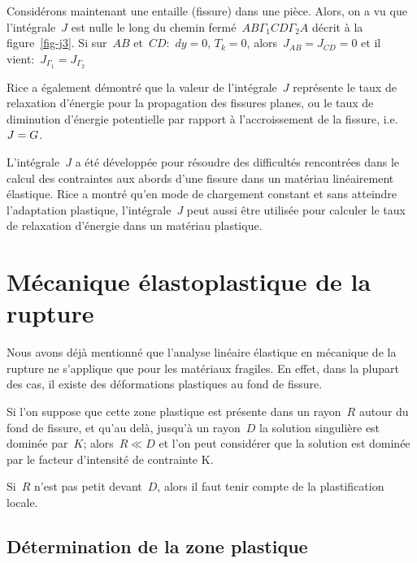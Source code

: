 \medskipvm
Considérons maintenant une entaille (fissure) dans une pièce. Alors, on a vu que l'intégrale~$J$ est nulle le long du chemin fermé~$AB\Gamma_1CD\Gamma_2A$ décrit à la figure~\ref{fig-j3}.
Si sur~$AB$ et~$CD$:~$dy=0$, $T_k=0$, alors~$J_{AB}=J_{CD}=0$
et il vient:~$J_{\Gamma_1} = J_{\Gamma_2}$

\medskip
Rice a également démontré que la valeur de l'intégrale~$J$ représente le taux de relaxation d'énergie pour la propagation des fissures planes, ou le taux de diminution d'énergie potentielle par rapport à l'accroissement de la fissure, i.e.~$\colorblue J=G$.

\medskip
L'intégrale~$J$ a été développée pour résoudre des difficultés rencontrées dans le calcul des contraintes aux abords d'une fissure dans un matériau linéairement élastique. Rice a montré qu'en mode de chargement constant et sans atteindre l'adaptation plastique, l'intégrale~$J$ peut aussi être utilisée pour calculer le taux de relaxation d'énergie dans un matériau plastique.






\medskip
\section{Mécanique élastoplastique de la rupture}

Nous avons déjà mentionné que l'analyse linéaire élastique en mécanique de la rupture ne s'applique que pour les matériaux fragiles. En effet, dans la plupart des cas, il existe des déformations plastiques au fond de fissure.

Si l'on suppose que cette zone plastique est présente dans un rayon~$R$ autour du fond de fissure, et qu'au delà, jusqu'à un rayon~$D$ la solution singulière est dominée par~$K$; alors~$R \ll D$ et l'on peut considérer que la solution est dominée par le facteur d'intensité de contrainte K.

Si~$R$ n'est pas petit devant~$D$, alors il faut tenir compte de la plastification locale.

\medskip
\subsection{Détermination de la zone plastique}

